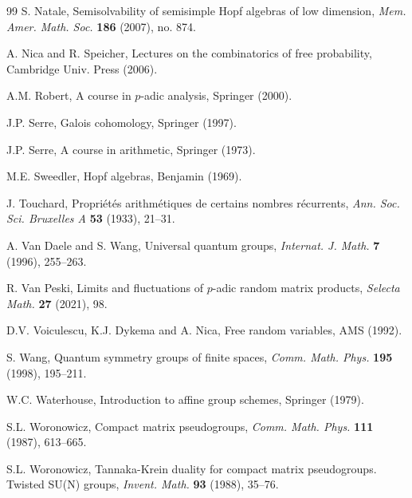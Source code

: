 \documentclass[11pt]{amsart}
\theoremstyle{definition}
\begin{document}
\begin{thebibliography}{99}
 S. Natale, Semisolvability of semisimple Hopf algebras of low dimension, {\em Mem. Amer. Math. Soc.} {\bf 186} (2007), no. 874.

 A. Nica and R. Speicher, Lectures on the combinatorics of free probability, Cambridge Univ. Press (2006).

 A.M. Robert, A course in $p$-adic analysis, Springer (2000).

 J.P. Serre, Galois cohomology, Springer (1997).

 J.P. Serre, A course in arithmetic, Springer (1973).

 M.E. Sweedler, Hopf algebras, Benjamin (1969).

 J. Touchard, Propri\'et\'es arithm\'etiques de certains nombres r\'ecurrents, {\em Ann. Soc. Sci. Bruxelles A} {\bf 53} (1933), 21--31.

 A. Van Daele and S. Wang, Universal quantum groups, {\em Internat. J. Math.} {\bf 7} (1996), 255--263.

 R. Van Peski, Limits and fluctuations of $p$-adic random matrix products, {\em Selecta Math.} {\bf 27} (2021), 98.

 D.V. Voiculescu, K.J. Dykema and A. Nica, Free random variables, AMS (1992).

 S. Wang, Quantum symmetry groups of finite spaces, {\em Comm. Math. Phys.} {\bf 195} (1998), 195--211.

 W.C. Waterhouse, Introduction to affine group schemes, Springer (1979).

 S.L. Woronowicz, Compact matrix pseudogroups, {\em Comm. Math. Phys.} {\bf 111} (1987), 613--665.

 S.L. Woronowicz, Tannaka-Krein duality for compact matrix pseudogroups. Twisted SU(N) groups, {\em Invent. Math.} {\bf 93} (1988), 35--76.

\end{thebibliography}
\end{document}
